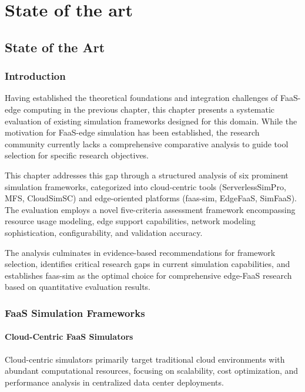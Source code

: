 \part{State of the art}

\chapter{State of the Art}

\section{Introduction}

Having established the theoretical foundations and integration challenges of FaaS-edge computing in the previous chapter, this chapter presents a systematic evaluation of existing simulation frameworks designed for this domain. While the motivation for FaaS-edge simulation has been established, the research community currently lacks a comprehensive comparative analysis to guide tool selection for specific research objectives.

This chapter addresses this gap through a structured analysis of six prominent simulation frameworks, categorized into cloud-centric tools (ServerlessSimPro, MFS, CloudSimSC) and edge-oriented platforms (faas-sim, EdgeFaaS, SimFaaS). The evaluation employs a novel five-criteria assessment framework encompassing resource usage modeling, edge support capabilities, network modeling sophistication, configurability, and validation accuracy.

The analysis culminates in evidence-based recommendations for framework selection, identifies critical research gaps in current simulation capabilities, and establishes faas-sim as the optimal choice for comprehensive edge-FaaS research based on quantitative evaluation results.

\section{FaaS Simulation Frameworks}


\subsection{Cloud-Centric FaaS Simulators}

Cloud-centric simulators primarily target traditional cloud environments with abundant computational resources, focusing on scalability, cost optimization, and performance analysis in centralized data center deployments.


